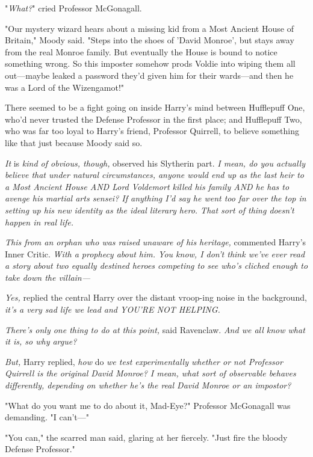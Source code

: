 "\emph{What?}" cried Professor McGonagall.

"Our mystery wizard hears about a missing kid from a Most Ancient House of 
Britain," Moody said. "Steps into the shoes of 'David Monroe', but stays away 
from the real Monroe family. But eventually the House is bound to notice 
something wrong. So this imposter somehow prods Voldie into wiping them all 
out---maybe leaked a password they'd given him for their wards---and then he 
was a Lord of the Wizengamot!"

There seemed to be a fight going on inside Harry's mind between Hufflepuff One, 
who'd never trusted the Defense Professor in the first place; and Hufflepuff 
Two, who was far too loyal to Harry's friend, Professor Quirrell, to believe 
something like that just because Moody said so.

\emph{It} is\emph{ kind of obvious, though,} observed his Slytherin part. 
\emph{I mean, do you actually believe that under natural circumstances, anyone 
would end up as the last heir to a Most Ancient House AND Lord Voldemort killed 
his family AND he has to avenge his martial arts sensei? If anything I'd say he 
went too far over the top in setting up his new identity as the ideal literary 
hero. That sort of thing doesn't happen in real life.} 

\emph{This from an orphan who was raised unaware of his heritage,} commented 
Harry's Inner Critic. \emph{With a prophecy about him. You know, I don't think 
we've ever read a story about two equally destined heroes competing to see 
who's cliched enough to take down the villain---}

\emph{Yes,} replied the central Harry over the distant vroop-ing noise in the 
background, \emph{it's a very sad life we lead and YOU'RE NOT HELPING.}

\emph{There's only one thing to do at this point,} said Ravenclaw. \emph{And we 
all know what it is, so why argue?}

\emph{But,} Harry replied, \emph{how} do\emph{ we test experimentally whether 
or not Professor Quirrell is the original David Monroe? I mean, what sort of 
observable behaves differently, depending on whether he's the real David Monroe 
or an impostor?}

"What do you want me to do about it, Mad-Eye?" Professor McGonagall was 
demanding. "I can't---"

"You can," the scarred man said, glaring at her fiercely. "Just fire the bloody 
Defense Professor."

